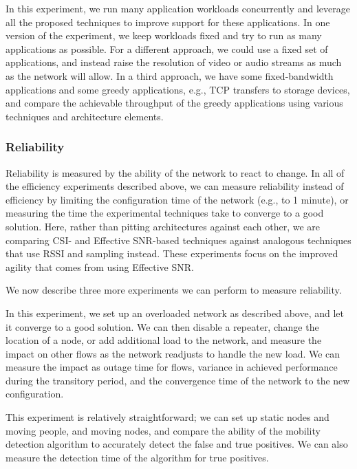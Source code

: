  In this experiment, we run many application workloads concurrently and leverage all the proposed techniques to improve support for these applications. In one version of the experiment, we keep workloads fixed and try to run as many applications as possible. For a different approach, we could use a fixed set of applications, and instead raise the resolution of video or audio streams as much as the network will allow. In a third approach, we have some fixed-bandwidth applications and some greedy applications, e.g., TCP transfers to storage devices, and compare the achievable throughput of the greedy applications using various techniques and architecture elements.


\subsubsection{Reliability}
Reliability is measured by the ability of the network to react to change. In all of the efficiency experiments described above, we can measure reliability instead of efficiency by limiting the configuration time of the network (e.g., to 1 minute), or measuring the time the experimental techniques take to converge to a good solution. Here, rather than pitting architectures against each other, we are comparing CSI- and Effective SNR-based techniques against analogous techniques that use RSSI and sampling instead. These experiments focus on the improved agility that comes from using Effective SNR.

We now describe three more experiments we can perform to measure reliability.

 In this experiment, we set up an overloaded network as described above, and let it converge to a good solution. We can then disable a repeater, change the location of a node, or add additional load to the network, and measure the impact on other flows as the network readjusts to handle the new load. We can measure the impact as outage time for flows, variance in achieved performance during the transitory period, and the convergence time of the network to the new configuration.

 This experiment is relatively straightforward; we can set up static nodes and moving people, and moving nodes, and compare the ability of the mobility detection algorithm to accurately detect the false and true positives. We can also measure the detection time of the algorithm for true positives.

